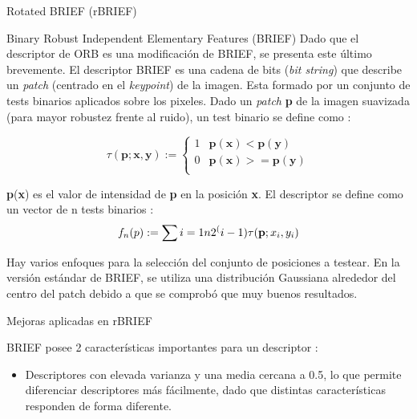 \begin{subsection}
\begin{subsection}
\begin{enumerate}
\end{enumerate}
\end{subsection}

\begin{subsection}
{Rotated BRIEF (rBRIEF) }
\begin{subsection}
{Binary Robust Independent Elementary Features (BRIEF) }
Dado que el descriptor de ORB es una modificación de BRIEF, se presenta este último brevemente. El descriptor BRIEF \cite{Calonder12} es una cadena de bits (\textit{\textsl{bit string}}) que describe un \textit{\textsl{patch}} (centrado en el \textit{\textsl{keypoint}}) de la imagen. Esta formado por un conjunto de tests binarios aplicados sobre los pixeles. Dado un \textit{\textsl{patch}} \textbf{p} de la imagen suavizada (para mayor robustez frente al ruido), un test binario se define como : 

\begin{equation}
\tau(\textbf{p}; \textbf{x}, \textbf{y}) := \left\lbrace
\begin{array}{cc}
1 & \textbf{p}(\textbf{x}) < \textbf{p}(\textbf{y})  \\
0 & \textbf{p}(\textbf{x}) >= \textbf{p}(\textbf{y}) \\
\end{array}
\right.
\end{equation}

\textbf{p}(\textbf{x}) es el valor de intensidad de \textbf{p} en la posición \textbf{x}.
El descriptor se define como un vector de n tests binarios :
\begin{equation}
\textsl{$f_{n}$}(p) := \sum{i=1}{n} 2^(i-1)\tau(\textbf{p}; \textbf{$x_{i}$}, \textbf{$y_{i}$})
\end{equation}

Hay varios enfoques para la selección del conjunto de posiciones a testear. En la versión estándar de BRIEF, se utiliza una distribución Gaussiana alrededor del centro del patch debido a que se comprobó que muy buenos resultados.
\end{subsection}

\begin{subsection}
{Mejoras aplicadas en rBRIEF}

BRIEF posee 2 características importantes para un descriptor :
\begin{itemize}

\item Descriptores con elevada varianza y una media cercana a 0.5, lo que permite diferenciar descriptores más fácilmente, dado que distintas características responden de forma diferente.


\end{itemize}
\end{subsection}
\end{subsection}
\end{subsection}
